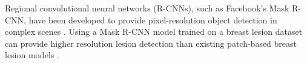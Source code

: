 Regional convolutional neural networks (R-CNNs), such as Facebook's Mask R-CNN, have been developed to provide pixel-resolution object detection in complex scenes \citep{mask_r_cnn}. Using a Mask R-CNN model trained on a breast lesion dataset can provide higher resolution lesion detection than existing patch-based breast lesion models \citep{wang2016}.




